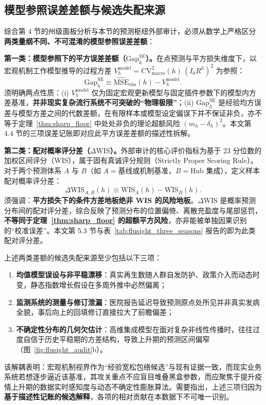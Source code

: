 \documentclass[10pt,a4paper]{article}
\theoremstyle{plain}
\theoremstyle{definition}
\begin{document}
\subsection{模型参照误差差额与候选失配来源}\label{sec:gap_attribution}

综合第 4 节的州级面板分析与本节的预测枢纽外部审计，必须从数学上严格区分\textbf{两类量纲不同、不可混淆的模型参照误差差额}：

\noindent\textbf{第一类：模型参照下的平方误差差额（$\mathrm{Gap}^{\text{SE}}_h$）。}在点预测与平方损失维度下，以宏观机制工作模型推导的过程方差 $V^{\text{model}}_h = \text{CV}^2_{\text{macro}}(h)\,(I_0 R^h)^2$ 为参照：
\begin{equation}
\mathrm{Gap}^{\text{SE}}_h \equiv \widehat{\text{MSE}}_{\text{obs}}(h) - V^{\text{model}}_h.
\label{eq:gap_se}
\end{equation}
须明确两点性质：(i) $V^{\text{model}}_h$ 仅为固定宏观更新模型与固定插件参数下的模型内方差基准，\textbf{并非现实复杂流行系统不可突破的“物理极限”}；(ii) $\mathrm{Gap}^{\text{SE}}_h$ 是经验均方误差与模型方差之间的代数差额，在有限样本或模型设定偏误下并不保证非负，亦不等于定理~\ref{thm:sharp_floor} 中处处非负的理论超额风险 $(m_h - \delta_h)^2$。本文第 4.4 节的三项误差记账即对应此平方误差差额的描述性拆解。

\noindent\textbf{第二类：配对概率评分差（$\Delta\text{WIS}$）。}外部审计的核心评价指标为基于 23 分位数的加权区间评分（WIS），属于固有真诚评分规则（Strictly Proper Scoring Rule）。对于两个预测体系 $A$ 与 $B$（如 $A = \text{基线或机制基准}$，$B = \text{Hub 集成}$），定义样本配对概率评分差：
\begin{equation}
\Delta\mathrm{WIS}_{A, B}(h) \equiv \overline{\mathrm{WIS}}_A(h) - \overline{\mathrm{WIS}}_B(h).
\label{eq:gap_wis}
\end{equation}
须强调：\textbf{平方损失下的条件方差地板绝非 WIS 的风险地板}。$\Delta\mathrm{WIS}$ 是概率预测分布间的配对评分差，综合反映了预测分布的位置偏倚、离散充盈度与尾部惩罚，\textbf{不等同于定理~\ref{thm:sharp_floor} 的超额平方风险}，亦非能被单独因果识别的“校准误差”。本文第 5.3 节与表~\ref{tab:flusight_three_seasons} 报告的即为此类配对评分差。

上述两类差额的候选失配来源至少包括以下三项：
\begin{enumerate}
\item \textbf{均值模型误设与非平稳漂移}：真实再生数随人群自发防护、政策介入而动态时变，静态指数增长假设在多周外推中必然偏离；
\item \textbf{监测系统的测量与修订泄漏}：医院报告延迟导致预测原点处所见并非真实发病全貌，事后向上的回填修订直接拉大了前瞻偏差；
\item \textbf{不确定性分布的几何欠估计}：高维集成模型在面对复杂非线性传播时，往往过度自信于历史平稳期的方差结构，导致上升期的预测区间偏窄（图~\ref{fig:flusight_audit}b）。
\end{enumerate}
该解耦表明：宏观机制视界作为“经验宽松包络候选”与现有证据一致，而现实业务系统若想逐步逼近该基准，其攻关重点不应盲目堆叠黑盒参数，而应聚焦于提升疫情上升期的数据实时感知度与动态不确定性膨胀算法。需要指出，上述三项归因为\textbf{基于描述性记账的候选解释}，各项的相对贡献在本数据下不可唯一识别。
\end{document}
